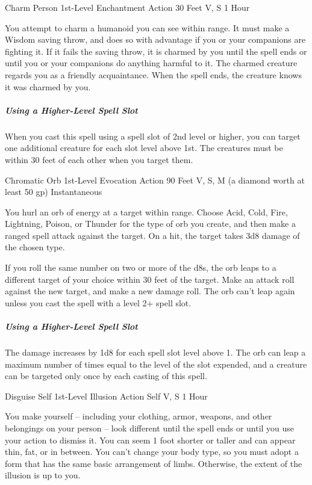 \documentclass[letterpaper,openany,oneside,twocolumn]{book}
\begin{document}
\DndSpellHeader
  {Charm Person}
  {1st-Level Enchantment}
  {Action}
  {30 Feet}
  {V, S}
  {1 Hour}

You attempt to charm a humanoid you can see within range. It must make a Wisdom saving throw, and does so with advantage if you or your companions are fighting it. If it fails the saving throw, it is charmed by you until the spell ends or until you or your companions do anything harmful to it. The charmed creature regards you as a friendly acquaintance. When the spell ends, the creature knows it was charmed by you.

\subparagraph*{Using a Higher-Level Spell Slot} When you cast this spell using a spell slot of 2nd level or higher, you can target one additional creature for each slot level above 1st. The creatures must be within 30 feet of each other when you target them.

\DndSpellHeader
  {Chromatic Orb}
  {1st-Level Evocation}
  {Action}
  {90 Feet}
  {V, S, M (a diamond worth at least 50 gp)}
  {Instantaneous}

You hurl an orb of energy at a target within range. Choose Acid, Cold, Fire, Lightning, Poison, or Thunder for the type of orb you create, and then make a ranged spell attack against the target. On a hit, the target takes 3d8 damage of the chosen type.

If you roll the same number on two or more of the d8s, the orb leaps to a different target of your choice within 30 feet of the target. Make an attack roll against the new target, and make a new damage roll. The orb can't leap again unless you cast the spell with a level 2+ spell slot.

\subparagraph*{Using a Higher-Level Spell Slot} The damage increases by 1d8 for each spell slot level above 1. The orb can leap a maximum number of times equal to the level of the slot expended, and a creature can be targeted only once by each casting of this spell.

\DndSpellHeader
  {Disguise Self}
  {1st-Level Illusion}
  {Action}
  {Self}
  {V, S}
  {1 Hour}

You make yourself – including your clothing, armor, weapons, and other belongings on your person – look different until the spell ends or until you use your action to dismiss it. You can seem 1 foot shorter or taller and can appear thin, fat, or in between. You can't change your body type, so you must adopt a form that has the same basic arrangement of limbs. Otherwise, the extent of the illusion is up to you.
\end{document}
